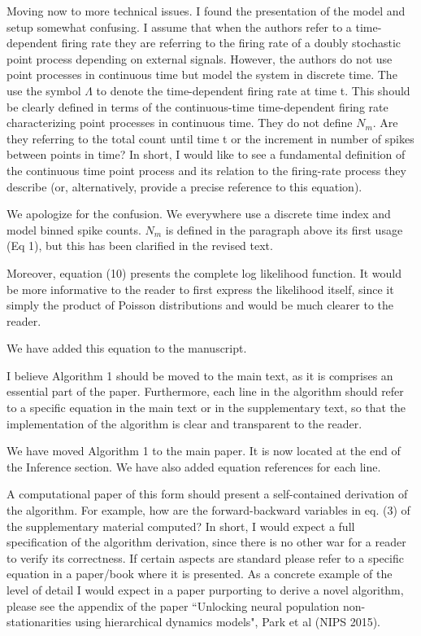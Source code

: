 \documentclass[12pt,a4paper]{article}
\newcommand{\edit}[1]{\textcolor{edit}{#1}}
\begin{document}
Moving now to more technical issues. I found the presentation of the model and setup somewhat confusing. I assume that when the authors refer to a time-dependent firing rate they are referring to the firing rate of a doubly stochastic point process depending on external signals. However, the authors do not use point processes in continuous time but model the system in discrete time. The use the symbol $\Lambda$ to denote the time-dependent firing rate at time t. This should be clearly defined in terms of the continuous-time time-dependent firing rate characterizing point processes in continuous time. They do not define $N_m$. Are they referring to the total count until time t or the increment in number of spikes between points in time? In short, I would like to see a fundamental definition of the continuous time point process and its relation to the firing-rate process they describe (or, alternatively, provide a precise reference to this equation).

\edit{
We apologize for the confusion. We everywhere use a discrete time index and model binned spike counts. $N_m$ is defined in the paragraph above its first usage (Eq 1), but this has been clarified in the revised text.
}

Moreover, equation (10) presents the complete log likelihood function. It would be more informative to the reader to first express the likelihood itself, since it simply the product of Poisson distributions and would be much clearer to the reader.

\edit{
We have added this equation to the manuscript.
}

I believe Algorithm 1 should be moved to the main text, as it is comprises an essential part of the paper. Furthermore, each line in the algorithm should refer to a specific equation in the main text or in the supplementary text, so that the implementation of the algorithm is clear and transparent to the reader.

\edit{
We have moved Algorithm 1 to the main paper. It is now located at the end of the Inference section. We have also added equation references for each line.
}

A computational paper of this form should present a self-contained derivation of the algorithm. For example, how are the forward-backward variables in eq. (3) of the supplementary material computed? In short, I would expect a full specification of the algorithm derivation, since there is no other war for a reader to verify its correctness. If certain aspects are standard please refer to a specific equation in a paper/book where it is presented. As a concrete example of the level of detail I would expect in a paper purporting to derive a novel algorithm, please see the appendix of the paper “Unlocking neural population non-stationarities using hierarchical dynamics models", Park et al (NIPS 2015).
\end{document}
